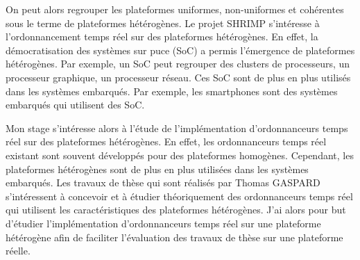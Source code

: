 On peut alors regrouper les plateformes uniformes, non-uniformes et cohérentes sous le terme de plateformes hétérogènes. Le projet SHRIMP s'intéresse à l'ordonnancement temps réel sur des plateformes hétérogènes. En effet, la démocratisation des systèmes sur puce (SoC) a permis l'émergence de plateformes hétérogènes. Par exemple, un SoC peut regrouper des clusters de processeurs, un processeur graphique, un processeur réseau. Ces SoC sont de plus en plus utilisés dans les systèmes embarqués. Par exemple, les smartphones sont des systèmes embarqués qui utilisent des SoC. 

Mon stage s'intéresse alors à l'étude de l'implémentation d'ordonnanceurs temps réel sur des plateformes hétérogènes. En effet, les ordonnanceurs temps réel existant sont souvent développés pour des plateformes homogènes. Cependant, les plateformes hétérogènes sont de plus en plus utilisées dans les systèmes embarqués. Les travaux de thèse qui sont réalisés par Thomas GASPARD s'intéressent à concevoir et à étudier théoriquement des ordonnanceurs temps réel qui utilisent les caractéristiques des plateformes hétérogènes. J'ai alors pour but d'étudier l'implémentation d'ordonnanceurs temps réel sur une plateforme hétérogène afin de faciliter l'évaluation des travaux de thèse sur une plateforme réelle.